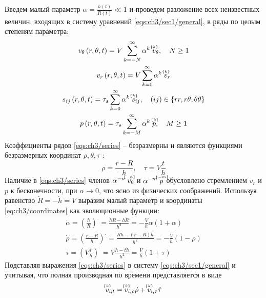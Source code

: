 Введем малый параметр $\alpha = \frac{h(t)}{R(t)} \ll 1$ и проведем разложение всех неизвестных величин, входящих в систему уравнений \cref{eqs:ch3/sec1/general}, в ряды по целым степеням параметра:
\begin{subequations}
  \label{eqs:ch3/series}
  \begin{gather}
    v_{\theta}\left(r, \theta, t\right) = V \sum_{k=-N}^{\infty}{\alpha^{k} \; \uindex{v}{k}_{\theta}}, \quad N \ge 1
    \\
    v_{r}\left(r, \theta, t\right) = V \sum_{k=0}^{\infty}{\alpha^{k} \; \uindex{v}{k}_{r}}
    \\
    s_{ij}\left(r, \theta, t\right) = \tau_{s} \sum_{k=0}^{\infty}{\alpha^{k} \; \uindex{s}{k}_{ij}}, \quad (ij)\in\{rr, r\theta, \theta\theta\}
    \\
    p\left(r, \theta, t \right) = \tau_{s} \sum_{k=-M}^{\infty}{\alpha^{k} \; \uindex{p}{k}}, \quad M \ge 1
  \end{gather}
\end{subequations}
Коэффициенты рядов \cref{eqs:ch3/series} -- безразмерны и являются функциями безразмерных координат $\rho, \theta, \tau$ :
\begin{equation}
  \label{eq:ch3/coordinates}
  \rho = \frac{r-R}{h}, \quad \tau = V \frac{t}{h}
\end{equation}
Наличие в \cref{eqs:ch3/series} членов $\alpha^{-n} \; \uindex{v}{-n}_{\theta}$ и $\alpha^{-m} \; \uindex{p}{-m}$ обусловлено стремлением $v_{r}$ и $p$ к бесконечности, при $\alpha\rightarrow 0$, что ясно из физических соображений.
Используя равенство $\dot{R}=-\dot{h}= V$ выразим малый параметр и координаты \cref{eq:ch3/coordinates} как эволюционные функции:
\begin{subequations}
  \begin{gather}
    \dot{\alpha} = \left(\frac{h}{R}\right)^. = \frac{\dot{h}R - h\dot{R}}{h^2} = -\frac{V}{h} \alpha \left(1+\alpha\right)
    \\
    \dot{\rho} = \left(\frac{r-R}{h}\right)^. = \frac{\dot{R} h - \left(r-R\right) \dot{h}}{h^2} = -\frac{V}{h}\left(1-\rho\right)
    \\
    \dot{\tau} = \left(V \frac{t}{h}\right)^. = V \frac{h - t\dot{h}}{h^2} = \frac{V}{h} \left(1+\tau\right)
  \end{gather}
\end{subequations}
Подставляя выражения \cref{eqs:ch3/series} в систему \cref{eqs:ch3/sec1/general} и учитывая, что полная производная по времени представляется в виде
\begin{equation*}
  \uindex{v}{k}_{i;t} = \uindex{v}{k}_{i,\rho} \dot{\rho} + \uindex{v}{k}_{i,\tau} \dot{\tau}
\end{equation*}
